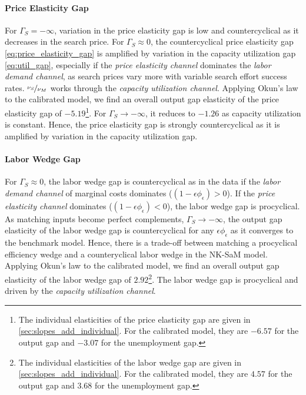 \documentclass[12pt,3p,authoryear,review]{elsarticle}
\begin{document}
\paragraph{Price Elasticity Gap}%
For $\Gamma_S = -\infty$, variation in the price elasticity gap is low and countercyclical as it decreases in the search price. For $\Gamma_S \approx 0$, the countercyclical price elasticity gap \eqref{eq:price_elasticity_gap} is amplified by variation in the capacity utilization gap \eqref{eq:util_gap}, especially if the \emph{price elasticity channel} dominates the \emph{labor demand channel}, as search prices vary more with variable search effort success rates. $\nicefrac{\nu_S}{\nu_M}$ works through the \emph{capacity utilization channel}. Applying Okun's law to the calibrated model, we find an overall output gap elasticity of the price elasticity gap of $-5.19$\footnote{The individual elasticities of the price elasticity gap are given in \ref{sec:slopes_add_individual}. For the calibrated model, they are $-6.57$ for the output gap and $-3.07$ for the unemployment gap.}. For $\Gamma_S \rightarrow -\infty$, it reduces to $-1.26$ as capacity utilization is constant. Hence, the price elasticity gap is strongly countercyclical as it is amplified by variation in the capacity utilization gap.%
\paragraph{Labor Wedge Gap}%
For $\Gamma_S \approx 0$, the labor wedge gap is countercyclical as in the data \citep{karabarbounis2014labor} if the \emph{labor demand channel} of marginal costs dominates ($(1-\epsilon\phi_\epsilon)>0$). If the \emph{price elasticity channel} dominates ($(1-\epsilon\phi_\epsilon)<0$), the labor wedge gap is procyclical. As matching inputs become perfect complements, $\Gamma_S \rightarrow -\infty$, the output gap elasticity of the labor wedge gap is countercyclical for any $\epsilon\phi_\epsilon$ as it converges to the benchmark model. Hence, there is a trade-off between matching a procyclical efficiency wedge and a counteryclical labor wedge in the NK-SaM model. Applying Okun's law to the calibrated model, we find an overall output gap elasticity of the labor wedge gap of $2.92$\footnote{The individual elasticities of the labor wedge gap are given in \ref{sec:slopes_add_individual}. For the calibrated model, they are $4.57$ for the output gap and $3.68$ for the unemployment gap.}. The labor wedge gap is procyclical and driven by the \emph{capacity utilization channel}.%
\end{document}
